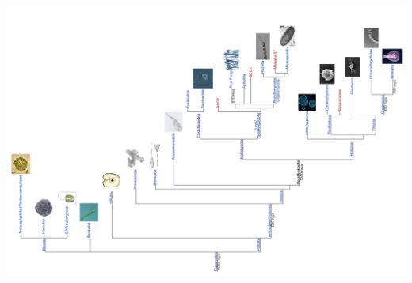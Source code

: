 \documentclass[10pt,dvipsnames,ignorenonframetext,aspectratio=169]{beamer}
\begin{document}
\begin{frame}{}
\protect\hypertarget{section-3}{}
\begin{center}\includegraphics[width=0.84\linewidth]{../images/wiki_opisthokonta} \end{center}
\end{frame}
\end{document}
